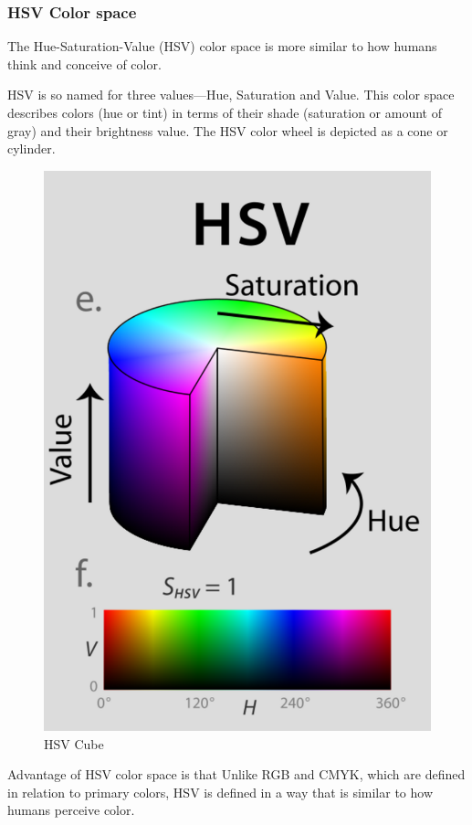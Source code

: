 \documentclass[BTech]{srmuthesis}
\begin{document}
\subsubsection{HSV Color space}

The Hue-Saturation-Value (HSV) color space is more similar to how humans think and conceive of color.

HSV is so named for three values—Hue, Saturation and Value. This color space describes colors (hue or tint) in terms of their shade (saturation or amount of gray) and their brightness value. The HSV color wheel is depicted as a cone or cylinder.

\begin{figure}[!hb]
    \centering
    \includegraphics[width=8cm\textwidth]{HSV_cube}
    \caption{HSV Cube}
    \label{fig:HSV Cube}
\end{figure}

\newpage

Advantage of HSV color space is that Unlike RGB and CMYK, which are defined in relation to primary colors, HSV is defined in a way that is similar to how humans perceive color.
\end{document}
